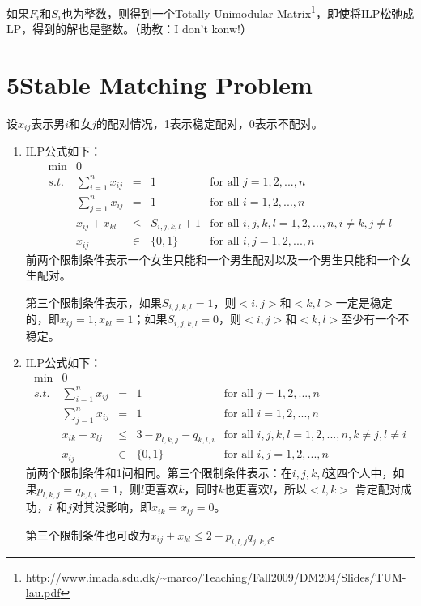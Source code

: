 \documentclass[a4paper,12pt]{article}
\begin{document}
如果$F_i$和$S_i$也为整数，则得到一个Totally Unimodular Matrix\footnote{\url{http://www.imada.sdu.dk/~marco/Teaching/Fall2009/DM204/Slides/TUM-lau.pdf}}，即使将ILP松弛成LP，得到的解也是整数。（助教：I don't konw!）

\section*{5\quad Stable Matching Problem}
设$x_{ij}$表示男$i$和女$j$的配对情况，1表示稳定配对，0表示不配对。

\begin{enumerate}
  \item ILP公式如下：
\[
\begin{array}{rrcll}
 \min & 0 &   \\
 s.t. & \sum_{i=1}^nx_{ij} & = & 1 & \text{for all $j=1,2,...,n$}  \\ \tag{4}
      & \sum_{j=1}^nx_{ij} & = & 1 & \text{for all $i=1,2,...,n$}  \\
      & x_{ij}+x_{kl} & \leq & S_{i,j,k,l}+1 & \text{for all $i,j,k,l=1,2,...,n, i\neq k,j\neq l$}\\
      & x_{ij} & \in & \{0,1\} & \text{for all $i,j=1,2,...,n$}
\end{array} \nonumber
\]
前两个限制条件表示一个女生只能和一个男生配对以及一个男生只能和一个女生配对。

第三个限制条件表示，如果$S_{i,j,k,l}=1$，则$<i,j>$和$<k,l>$一定是稳定的，即$x_{ij}=1,x_{kl}=1$；如果$S_{i,j,k,l}=0$，则$<i,j>$和$<k,l>$至少有一个不稳定。
  \item ILP公式如下：
\[
\begin{array}{rrcll}
 \min & 0 &   \\
 s.t. & \sum_{i=1}^nx_{ij} & = & 1 & \text{for all $j=1,2,...,n$}  \\ \tag{5}
      & \sum_{j=1}^nx_{ij} & = & 1 & \text{for all $i=1,2,...,n$}  \\
      & x_{ik}+x_{lj} & \leq & 3-p_{l,k,j}-q_{k,l,i} & \text{for all $i,j,k,l=1,2,...,n, k\neq j,l\neq i$}\\
      & x_{ij} & \in & \{0,1\} & \text{for all $i,j=1,2,...,n$}
\end{array} \nonumber
\]
前两个限制条件和1问相同。第三个限制条件表示：在$i,j,k,l$这四个人中，如果$p_{l,k,j}=q_{k,l,i}=1$，则$l$更喜欢$k$，同时$k$也更喜欢$l$，所以$<l,k>$ 肯定配对成功，$i$ 和$j$对其没影响，即$x_{ik}=x_{lj}=0$。

第三个限制条件也可改为$x_{ij}+x_{kl}\leq 2-p_{i,l,j}q_{j,k,i}$。
\end{enumerate}
\end{document}
